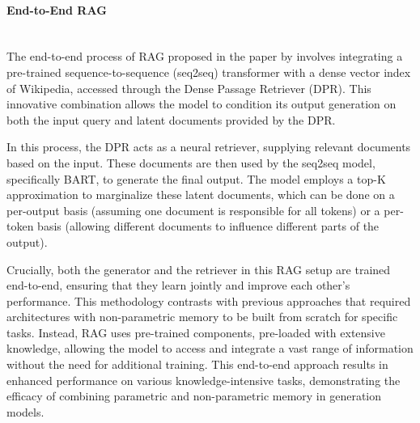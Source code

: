 \documentclass[11pt]{article}
\begin{document}
\paragraph{End-to-End RAG} \mbox{} \\
\label{subsubsubsec:End-to-End}
The end-to-end process of RAG proposed in the paper by \cite{lewis2021RAG} involves integrating a pre-trained sequence-to-sequence (seq2seq) transformer with a dense vector index of Wikipedia, accessed through the Dense Passage Retriever (DPR). This innovative combination allows the model to condition its output generation on both the input query and latent documents provided by the DPR.

In this process, the DPR acts as a neural retriever, supplying relevant documents based on the input. These documents are then used by the seq2seq model, specifically BART, to generate the final output. The model employs a top-K approximation to marginalize these latent documents, which can be done on a per-output basis (assuming one document is responsible for all tokens) or a per-token basis (allowing different documents to influence different parts of the output). 

Crucially, both the generator and the retriever in this RAG setup are trained end-to-end, ensuring that they learn jointly and improve each other's performance. This methodology contrasts with previous approaches that required architectures with non-parametric memory to be built from scratch for specific tasks. Instead, RAG uses pre-trained components, pre-loaded with extensive knowledge, allowing the model to access and integrate a vast range of information without the need for additional training. This end-to-end approach results in enhanced performance on various knowledge-intensive tasks, demonstrating the efficacy of combining parametric and non-parametric memory in generation models.
\end{document}
